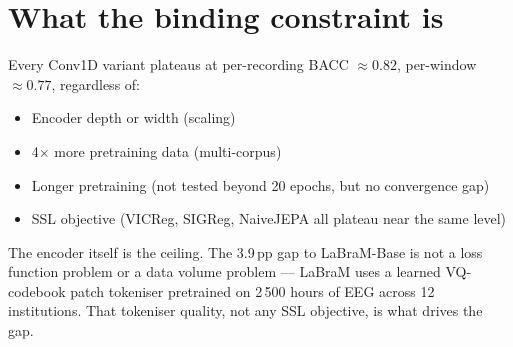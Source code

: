 \documentclass[11pt,a4paper]{article}
\begin{document}
\section{What the binding constraint is}

Every Conv1D variant plateaus at per-recording BACC $\approx 0.82$,
per-window $\approx 0.77$, regardless of:
\begin{itemize}[noitemsep]
  \item Encoder depth or width (scaling)
  \item 4× more pretraining data (multi-corpus)
  \item Longer pretraining (not tested beyond 20 epochs, but no convergence gap)
  \item SSL objective (VICReg, SIGReg, NaiveJEPA all plateau near the same level)
\end{itemize}

The encoder itself is the ceiling.  The 3.9\,pp gap to LaBraM-Base is not a loss
function problem or a data volume problem — LaBraM uses a learned VQ-codebook
patch tokeniser pretrained on 2\,500 hours of EEG across 12 institutions.
That tokeniser quality, not any SSL objective, is what drives the gap.
\end{document}
